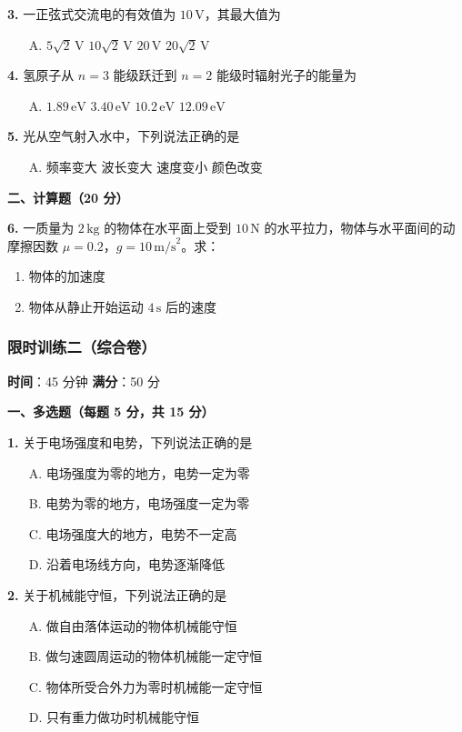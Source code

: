 \textbf{3.} 一正弦式交流电的有效值为 $10\,\text{V}$，其最大值为
\begin{enumerate}
  \item[A.] $5\sqrt{2}\,\text{V}$ \quad [B.] $10\sqrt{2}\,\text{V}$ \quad [C.] $20\,\text{V}$ \quad [D.] $20\sqrt{2}\,\text{V}$
\end{enumerate}

\textbf{4.} 氢原子从 $n=3$ 能级跃迁到 $n=2$ 能级时辐射光子的能量为
\begin{enumerate}
  \item[A.] $1.89\,\text{eV}$ \quad [B.] $3.40\,\text{eV}$ \quad [C.] $10.2\,\text{eV}$ \quad [D.] $12.09\,\text{eV}$
\end{enumerate}

\textbf{5.} 光从空气射入水中，下列说法正确的是
\begin{enumerate}
  \item[A.] 频率变大 \quad [B.] 波长变大 \quad [C.] 速度变小 \quad [D.] 颜色改变
\end{enumerate}

\textbf{二、计算题（20 分）}

\textbf{6.} 一质量为 $2\,\text{kg}$ 的物体在水平面上受到 $10\,\text{N}$ 的水平拉力，物体与水平面间的动摩擦因数 $\mu = 0.2$，$g = 10\,\text{m/s}^2$。求：
\begin{enumerate}
  \item 物体的加速度
  \item 物体从静止开始运动 $4\,\text{s}$ 后的速度
\end{enumerate}

\subsubsection{限时训练二（综合卷）}

\textbf{时间}：45 分钟 \quad \textbf{满分}：50 分

\textbf{一、多选题（每题 5 分，共 15 分）}

\textbf{1.} 关于电场强度和电势，下列说法正确的是
\begin{enumerate}
  \item[A.] 电场强度为零的地方，电势一定为零
  \item[B.] 电势为零的地方，电场强度一定为零
  \item[C.] 电场强度大的地方，电势不一定高
  \item[D.] 沿着电场线方向，电势逐渐降低
\end{enumerate}

\textbf{2.} 关于机械能守恒，下列说法正确的是
\begin{enumerate}
  \item[A.] 做自由落体运动的物体机械能守恒
  \item[B.] 做匀速圆周运动的物体机械能一定守恒
  \item[C.] 物体所受合外力为零时机械能一定守恒
  \item[D.] 只有重力做功时机械能守恒
\end{enumerate}

